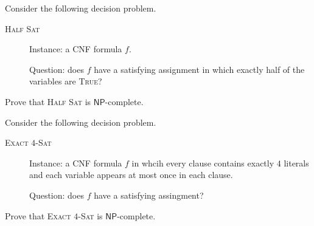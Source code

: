 \documentclass[a4paper, answers]{exam}
\begin{document}
\begin{questions}
	\question Consider the following decision problem.
	\begin{description}
		\item[\textsc{Half Sat}] \hfill

		Instance: a CNF formula $f$.

		Question: does $f$ have a satisfying assignment in which exactly half of
		the variables are \textsc{True}?
	\end{description}
	Prove that \textsc{Half Sat} is $\mathsf{NP}$-complete.

	\question Consider the following decision problem.
	\begin{description}
		\item[\textsc{Exact $4$-Sat}] \hfill
		
		Instance: a CNF formula $f$ in whcih every clause contains exactly $4$
		literals and each variable appears at most once in each clause.

		Question: does $f$ have a satisfying assingment?
	\end{description}
	Prove that \textsc{Exact $4$-Sat} is $\mathsf{NP}$-complete.
\end{questions}
\end{document}
